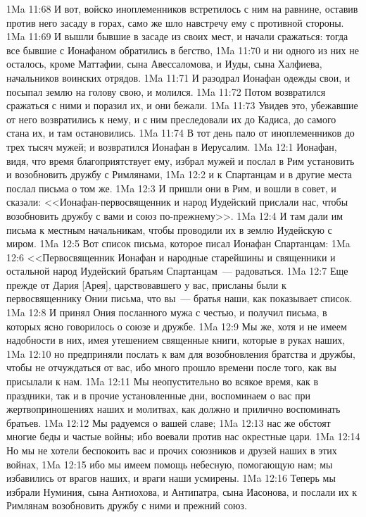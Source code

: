 \vs 1Ma 11:68 И вот, войско иноплеменников встретилось с ним на равнине, оставив против него засаду в горах, само же шло навстречу ему с противной стороны.
\vs 1Ma 11:69 И вышли бывшие в засаде из своих мест, и начали сражаться: тогда все бывшие с Ионафаном обратились в бегство,
\vs 1Ma 11:70 и ни одного из них не осталось, кроме Маттафии, сына Авессаломова, и Иуды, сына Халфиева, начальников воинских отрядов.
\vs 1Ma 11:71 И разодрал Ионафан одежды свои, и посыпал землю на голову свою, и молился.
\vs 1Ma 11:72 Потом возвратился сражаться с ними и поразил их, и они бежали.
\vs 1Ma 11:73 Увидев это, убежавшие от него возвратились к нему, и с ним преследовали их до Кадиса, до самого стана их, и там остановились.
\vs 1Ma 11:74 В тот день пало от иноплеменников до трех тысяч мужей; и возвратился Ионафан в Иерусалим.
\vs 1Ma 12:1 Ионафан, видя, что время благоприятствует ему, избрал мужей и послал в Рим установить и возобновить дружбу с Римлянами,
\vs 1Ma 12:2 и к Спартанцам и в другие места послал письма о том же.
\vs 1Ma 12:3 И пришли они в Рим, и вошли в совет, и сказали: <<Ионафан-первосвященник и народ Иудейский прислали нас, чтобы возобновить дружбу с вами и союз по-прежнему>>.
\vs 1Ma 12:4 И там дали им письма к местным начальникам, чтобы проводили их в землю Иудейскую с миром.
\vs 1Ma 12:5 Вот список письма, которое писал Ионафан Спартанцам:
\vs 1Ma 12:6 <<Первосвященник Ионафан и народные старейшины и священники и остальной народ Иудейский братьям Спартанцам~--- радоваться.
\vs 1Ma 12:7 Еще прежде от Дария [Арея], царствовавшего у вас, присланы были к первосвященнику Онии письма, что вы~--- братья наши, как показывает список.
\vs 1Ma 12:8 И принял Ония посланного мужа с честью, и получил письма, в которых ясно говорилось о союзе и дружбе.
\vs 1Ma 12:9 Мы же, хотя и не имеем надобности в них, имея утешением священные книги, которые в руках наших,
\vs 1Ma 12:10 но предприняли послать к вам для возобновления братства и дружбы, чтобы не отчуждаться от вас, ибо много прошло времени после того, как вы присылали к нам.
\vs 1Ma 12:11 Мы неопустительно во всякое время, как в праздники, так и в прочие установленные дни, воспоминаем о вас при жертвоприношениях наших и молитвах, как должно и прилично воспоминать братьев.
\vs 1Ma 12:12 Мы радуемся о вашей славе;
\vs 1Ma 12:13 нас же обстоят многие беды и частые войны; ибо воевали против нас окрестные цари.
\vs 1Ma 12:14 Но мы не хотели беспокоить вас и прочих союзников и друзей наших в этих войнах,
\vs 1Ma 12:15 ибо мы имеем помощь небесную, помогающую нам; мы избавились от врагов наших, и враги наши усмирены.
\vs 1Ma 12:16 Теперь мы избрали Нуминия, сына Антиохова, и Антипатра, сына Иасонова, и послали их к Римлянам возобновить дружбу с ними и прежний союз.
